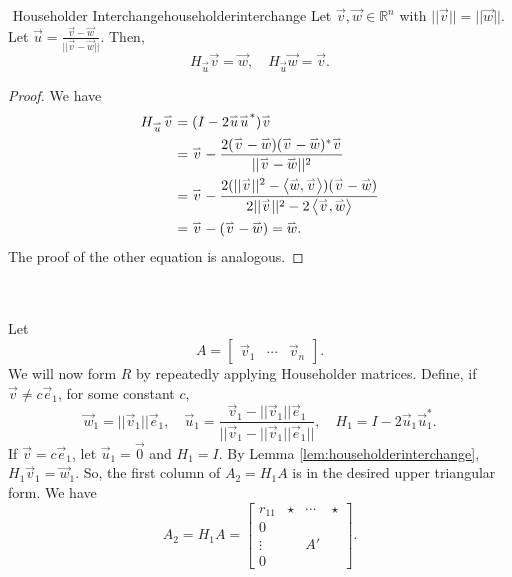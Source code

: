         \begin{lemma}{\Stop\,\,Householder Interchange}{householderinterchange}
            Let \(\vec{v},\vec{w}\in\mathbb{R}^n\) with \(||\vec{v}||=||\vec{w}||\). Let \(\vec{u}=\frac{\vec{v}-\vec{w}}{||\vec{v}-\vec{w}||}\). Then,
            \begin{equation*}
                H_{\vec{u}}\vec{v}=\vec{w},\quad H_{\vec{u}}\vec{w}=\vec{v}.
            \end{equation*}
            \begin{proof}
                We have
                \begin{align*}
                    H_{\overset{_{\rightharpoonup}}{u}}\overset{_{\rightharpoonup}}{v}&=(I-2\overset{_{\rightharpoonup}}{u}\overset{_{\rightharpoonup}}{u}^*)\overset{_{\rightharpoonup}}{v} \\
                    &=\overset{_{\rightharpoonup}}{v}-\frac{2(\overset{_{\rightharpoonup}}{v}-\overset{_{\rightharpoonup}}{w})(\overset{_{\rightharpoonup}}{v}-\overset{_{\rightharpoonup}}{w})^*\overset{_{\rightharpoonup}}{v}}{||\overset{_{\rightharpoonup}}{v}-\overset{_{\rightharpoonup}}{w}||^2} \\
                    &=\overset{_{\rightharpoonup}}{v}-\frac{2(||\overset{_{\rightharpoonup}}{v}||^2-\left\langle \overset{_{\rightharpoonup}}{w},\overset{_{\rightharpoonup}}{v}\right\rangle)(\overset{_{\rightharpoonup}}{v}-\overset{_{\rightharpoonup}}{w})}{2||\overset{_{\rightharpoonup}}{v}||^2-2\left\langle \overset{_{\rightharpoonup}}{v},\overset{_{\rightharpoonup}}{w}\right\rangle} \\
                    &=\overset{_{\rightharpoonup}}{v}-(\overset{_{\rightharpoonup}}{v}-\overset{_{\rightharpoonup}}{w})=\overset{_{\rightharpoonup}}{w}.
                \end{align*}
                The proof of the other equation is analogous.
            \end{proof}
        \end{lemma}
        \vphantom
        \\
        \\
        Let
        \begin{equation*}
            A=\begin{bmatrix}
                \vec{v}_1 & \cdots & \vec{v}_n
            \end{bmatrix}.
        \end{equation*}
        We will now form \(R\) by repeatedly applying Householder matrices. Define, if \(\vec{v}\neq c\vec{e}_1\), for some constant \(c\),
        \begin{equation*}
            \vec{w}_1=||\vec{v}_1||\vec{e}_1,\quad \vec{u}_1=\frac{\vec{v}_1-||\vec{v}_1||\vec{e}_1}{||\vec{v}_1-||\vec{v}_1||\vec{e}_1||},\quad H_1=I-2\vec{u}_1\vec{u}_1^*.
        \end{equation*}
        If \(\vec{v}=c\vec{e}_1\), let \(\vec{u}_1=\vec{0}\) and \(H_1=I\). By Lemma \ref{lem:householderinterchange}, \(H_1\vec{v}_1=\vec{w}_1\). So, the first column of \(A_2=H_1A\) is in the desired upper triangular form. We have
        \begin{equation*}
           A_2=H_1A=\begin{bmatrix}
                r_{11} & \star & \cdots & \star \\
                       0 &       &        &       \\
                  \vdots &       &     A' &       \\
                       0 &       &        &
              \end{bmatrix}.
        \end{equation*}
